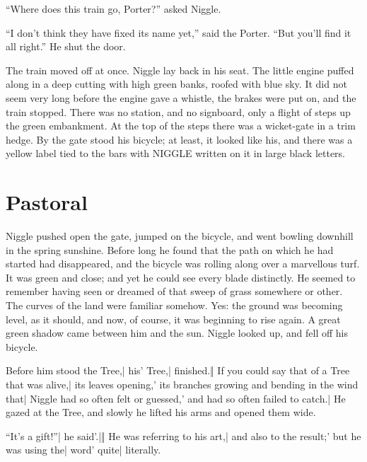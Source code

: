 “Where does this train go, Porter?” asked Niggle.

“I don’t think they have fixed its name yet,” said the Porter. “But you’ll find it all right.” He shut the door.

The train moved off at once. Niggle lay back in his seat. The little engine puffed along in a deep cutting with high green banks, roofed with blue sky. It did not seem very long before the engine gave a whistle, the brakes were put on, and the train stopped. There was no station, and no signboard, only a flight of steps up the green embankment. At the top of the steps there was a wicket-gate in a trim hedge. By the gate stood his bicycle; at least, it looked like his, and there was a yellow label tied to the bars with NIGGLE written on it in large black letters.

\section*{Pastoral}

Niggle pushed open the gate, jumped on the bicycle, and went bowling downhill in the spring sunshine. Before long he found that the path on which he had started had disappeared, and the bicycle was rolling along over a marvellous turf. It was green and close; and yet he could see every blade distinctly. He seemed to remember having seen or dreamed of that sweep of grass somewhere or other. The curves of the land were familiar somehow. Yes: the ground was becoming level, as it should, and now, of course, it was beginning to rise again. A great green shadow came between him and the sun. Niggle looked up, and fell off his bicycle.


\begin{itemize}
\halfone Before him stood the Tree,| his' Tree,| finished.‖ If you could say that of a Tree that was alive,| its leaves opening,' its branches growing and bending in the wind that| Niggle had so often felt or guessed,' and had so often failed to catch.| He gazed at the Tree, and slowly he lifted his arms and opened them wide.
\end{itemize}

\begin{itemize}
\halftwo “It’s a gift!”| he said'.|‖ He was referring to his art,| and also to the result;' but he was using the| word' quite| literally.
\end{itemize}

